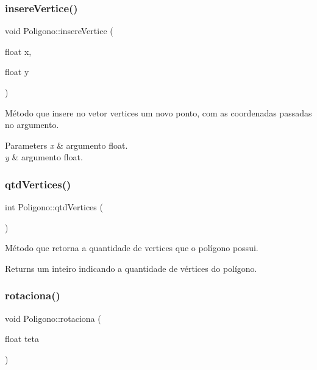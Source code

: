 \subsubsection{\texorpdfstring{insere\+Vertice()}{insereVertice()}}
{\footnotesize\ttfamily void Poligono\+::insere\+Vertice (\begin{DoxyParamCaption}\item[{float}]{x,  }\item[{float}]{y }\end{DoxyParamCaption})}



Método que insere no vetor \textquotesingle{}vertices\textquotesingle{} um novo ponto, com as coordenadas passadas no argumento. 


\begin{DoxyParams}{Parameters}
{\em x} & argumento float. \\
\hline
{\em y} & argumento float. \\
\hline
\end{DoxyParams}
\mbox{\label{classPoligono_ae2c1c915b4a72104724d1302138e7caa}} 
\subsubsection{\texorpdfstring{qtd\+Vertices()}{qtdVertices()}}
{\footnotesize\ttfamily int Poligono\+::qtd\+Vertices (\begin{DoxyParamCaption}{ }\end{DoxyParamCaption})}



Método que retorna a quantidade de vertices que o polígono possui. 

\begin{DoxyReturn}{Returns}
um inteiro indicando a quantidade de vértices do polígono. 
\end{DoxyReturn}
\mbox{\label{classPoligono_a937c0e2bec60140fcc7b7bde5d64d339}} 
\subsubsection{\texorpdfstring{rotaciona()}{rotaciona()}}
{\footnotesize\ttfamily void Poligono\+::rotaciona (\begin{DoxyParamCaption}\item[{float}]{teta }\end{DoxyParamCaption})}



